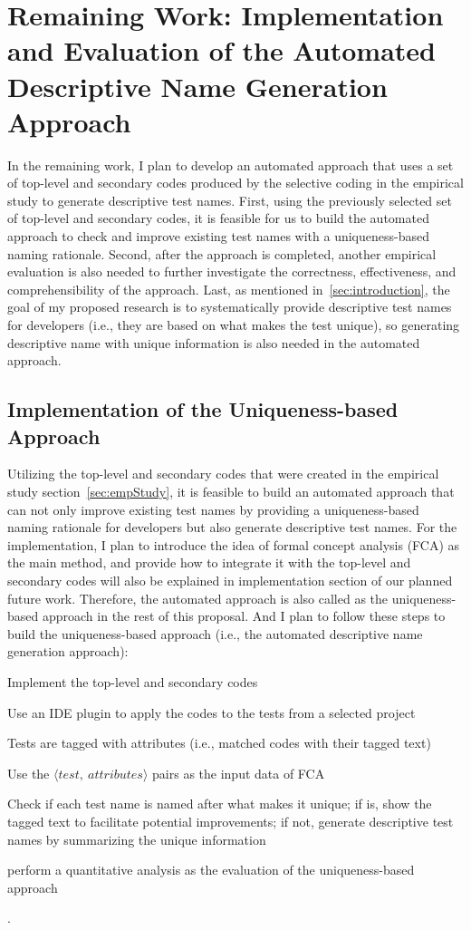 \section{Remaining Work: Implementation and Evaluation of the Automated Descriptive Name Generation Approach}
\label{sec:remaining-work}

In the remaining work, I plan to develop an automated approach that uses a set of top-level and secondary codes produced by the selective coding in the empirical study to generate descriptive test names.
%
First, using the previously selected set of top-level and secondary codes, it is feasible for us to build the automated approach to check and improve existing test names with a uniqueness-based naming rationale.
%
Second, after the approach is completed, another empirical evaluation is also needed to further investigate the correctness, effectiveness, and comprehensibility of the approach.
%
Last, as mentioned in~\cref{sec:introduction}, the goal of my proposed research is to systematically provide descriptive test names for developers (i.e., they are based on what makes the test unique), so generating descriptive name with unique information is also needed in the automated approach.

\subsection{Implementation of the Uniqueness-based Approach}

Utilizing the top-level and secondary codes that were created in the empirical study section~\cref{sec:empStudy}, it is feasible to build an automated approach that can not only improve existing test names by providing a uniqueness-based naming rationale for developers but also generate descriptive test names.
%
For the implementation, I plan to introduce the idea of formal concept analysis (FCA) as the main method, and provide how to integrate it with the top-level and secondary codes will also be explained in implementation section of our planned future work.
%
Therefore, the automated approach is also called as the uniqueness-based approach in the rest of this proposal.
%
And I plan to follow these steps to build the uniqueness-based approach (i.e., the automated descriptive name generation approach):
\begin{enumerate*}
    \item Implement the top-level and secondary codes
    \item Use an IDE plugin to apply the codes to the tests from a selected project
    \item Tests are tagged with attributes (i.e., matched codes with their tagged text)
    \item Use the $\langle test, ~attributes \rangle$ pairs as the input data of FCA
    \item Check if each test name is named after what makes it unique; if is, show the tagged text to facilitate potential improvements; if not, generate descriptive test names by summarizing the unique information
    \item perform a quantitative analysis as the evaluation of the uniqueness-based approach
\end{enumerate*}.

